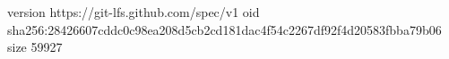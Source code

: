 version https://git-lfs.github.com/spec/v1
oid sha256:28426607cddc0c98ea208d5cb2cd181dac4f54c2267df92f4d20583fbba79b06
size 59927
